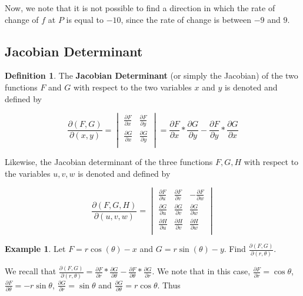 \documentclass[11pt]{article}
\theoremstyle{plain} %
\theoremstyle{definition}
\newtheorem*{definition}{Definition} %
\theoremstyle{example}
\newtheorem*{example}{Example}
\theoremstyle{remark}
\begin{document}
Now, we note that it is not possible to find a direction in which the rate of change of $f$ at $P$ is equal to $-10$, since the rate of change is between $-9$ and $9$. 

\subsection{Jacobian Determinant}

\begin{definition}
The \textbf{Jacobian Determinant} (or simply the Jacobian) of the two functions $F$ and $G$ with respect to the two variables $x$ and $y$ is denoted and defined by 

$$\frac{\partial (F,G)}{\partial (x,y)} = 
	\begin{vmatrix}
		\frac{\partial F}{\partial x} & \frac{\partial F}{\partial y} \\
		\frac{\partial G}{\partial x} & \frac{\partial G}{\partial y} \\
	\end{vmatrix} = \frac{\partial F}{\partial x}*\frac{\partial G}{\partial y}-\frac{\partial F}{\partial y}*\frac{\partial G}{\partial x}
$$
\end{definition}

Likewise, the Jacobian determinant of the three functions $F,G,H$ with respect to the variables $u,v,w$ is denoted and defined by 

$$\frac{\partial (F,G,H)}{\partial (u,v,w)} = 
	\begin{vmatrix}
		\frac{\partial F}{\partial u} & \frac{\partial F}{\partial v} & -\frac{\partial F}{\partial w}\\
		\frac{\partial G}{\partial u} & \frac{\partial G}{\partial v} & \frac{\partial G}{\partial w}\\
		\frac{\partial H}{\partial u} & \frac{\partial H}{\partial v} & \frac{\partial H}{\partial w}\\
		
	\end{vmatrix} $$

\begin{example}
Let $F=r\cos(\theta)-x$ and $G= r\sin(\theta)-y$. Find $\frac{\partial (F,G)}{\partial (r, \theta)}$. \end{example}

We recall that $\frac{\partial (F,G)}{\partial (r, \theta)} = \frac{\partial F}{\partial r}*\frac{\partial G}{\partial \theta}-\frac{\partial F}{\partial \theta}*\frac{\partial G}{\partial r} $. We note that in this case, $\frac{\partial F}{\partial r} = \cos\theta$, $\frac{\partial F}{\partial \theta} = -r\sin\theta$, $\frac{\partial G}{\partial r} = \sin\theta$ and $\frac{\partial G}{\partial \theta} = r\cos\theta$. Thus
\end{document}
